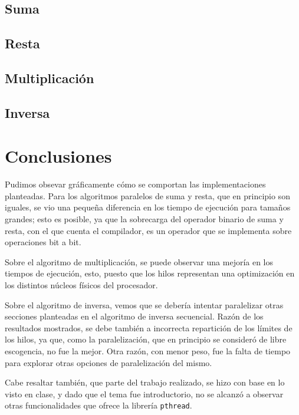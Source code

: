 \documentclass{article}
\begin{document}
\subsection*{Suma}
\subsection*{Resta}
\subsection*{Multiplicación}
\subsection*{Inversa}
\section{Conclusiones}
Pudimos obsevar gráficamente cómo se comportan las implementaciones planteadas. Para los algoritmos paralelos de suma y resta, que en principio son iguales, se vio una pequeña diferencia en los tiempo de ejecución para tamaños grandes; esto es posible, ya que la sobrecarga del operador binario de suma y resta, con el que cuenta el compilador, es un operador que se implementa sobre operaciones bit a bit.

Sobre el algoritmo de multiplicación, se puede observar una mejoría en los tiempos de ejecución, esto, puesto que los hilos representan una optimización en los distintos núcleos físicos del procesador.

Sobre el algoritmo de inversa, vemos que se debería intentar paralelizar otras secciones planteadas en el algoritmo de inversa secuencial. Razón de los resultados mostrados, se debe también a incorrecta repartición de los límites de los hilos, ya que, como la paralelización, que en principio se consideró de libre escogencia, no fue la mejor. Otra razón, con menor peso, fue la falta de tiempo para explorar otras opciones de paralelización del mismo.

Cabe resaltar también, que parte del trabajo realizado, se hizo con base en lo visto en clase, y dado que el tema fue introductorio, no se alcanzó a observar otras funcionalidades que ofrece la librería \texttt{pthread}.
\end{document}

